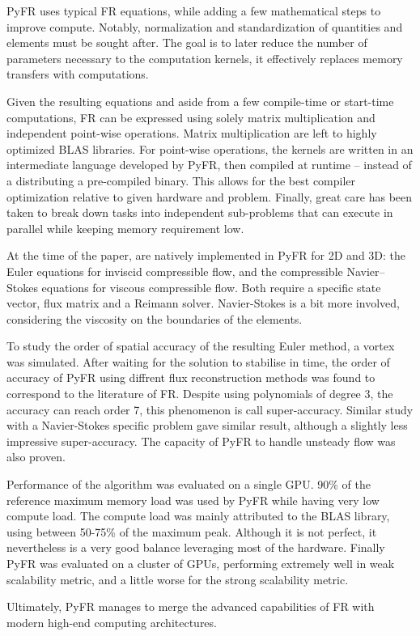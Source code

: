 \documentclass[12pt]{article}
\begin{document}
PyFR uses typical FR equations, while adding a few mathematical steps to improve compute. Notably, normalization and standardization of quantities and elements must be sought after. The goal is to later reduce the number of parameters necessary to the computation kernels, it effectively replaces memory transfers with computations. 

Given the resulting equations and aside from a few compile-time or start-time computations, FR can be expressed using solely matrix multiplication and independent point-wise operations. Matrix multiplication are left to highly optimized BLAS libraries. For point-wise operations, the kernels are written in an intermediate language developed by PyFR, then compiled at runtime -- instead of a distributing a pre-compiled binary. This allows for the best compiler optimization relative to given hardware and problem. Finally, great care has been taken to break down tasks into independent sub-problems that can execute in parallel while keeping memory requirement low.

At the time of the paper, are natively implemented in PyFR for 2D and 3D: the Euler equations for inviscid compressible flow, and the compressible Navier–Stokes equations for viscous compressible flow. Both require a specific state vector, flux matrix and a Reimann solver. Navier-Stokes is a bit more involved, considering the viscosity on the boundaries of the elements.

To study the order of spatial accuracy of the resulting Euler method, a vortex was simulated. After waiting for the solution to stabilise in time, the order of accuracy of PyFR using diffrent flux reconstruction methods was found to correspond to the literature of FR. Despite using polynomials of degree 3, the accuracy can reach order 7, this phenomenon is call super-accuracy. Similar study with a Navier-Stokes specific problem gave similar result, although a slightly less impressive super-accuracy. The capacity of PyFR to handle unsteady flow was also proven.

Performance of the algorithm was evaluated on a single GPU.  90\% of the reference maximum memory load was used by PyFR while having very low compute load. The compute load was mainly attributed to the BLAS library, using between 50-75\% of the maximum peak. Although it is not perfect, it nevertheless is a very good balance leveraging most of the hardware. Finally PyFR was evaluated on a cluster of GPUs, performing extremely well in weak scalability metric, and a little worse for the strong scalability metric.

Ultimately, PyFR manages to merge the advanced capabilities of FR with modern high-end computing architectures.
\end{document}
